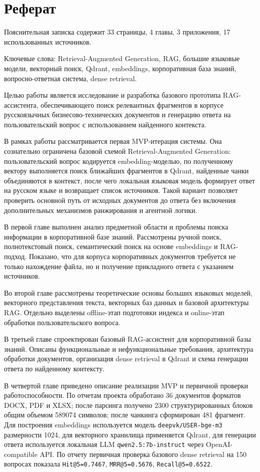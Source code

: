 \chapter*{Реферат}
\thispagestyle{plain}

Пояснительная записка содержит 33 страницы, 4 главы, 3 приложения, 17 использованных источников.

Ключевые слова: Retrieval-Augmented Generation, RAG, большие языковые модели, векторный поиск, Qdrant, embeddings, корпоративная база знаний, вопросно-ответная система, dense retrieval.

Целью работы является исследование и разработка базового прототипа RAG-ассистента, обеспечивающего поиск релевантных фрагментов в корпусе русскоязычных бизнесово-технических документов и генерацию ответа на пользовательский вопрос с использованием найденного контекста.

В рамках работы рассматривается первая MVP-итерация системы. Она сознательно ограничена базовой схемой Retrieval-Augmented Generation: пользовательский вопрос кодируется embedding-моделью, по полученному вектору выполняется поиск ближайших фрагментов в Qdrant, найденные чанки объединяются в контекст, после чего локальная языковая модель формирует ответ на русском языке и возвращает список источников. Такой вариант позволяет проверить основной путь от исходных документов до ответа без включения дополнительных механизмов ранжирования и агентной логики.

В первой главе выполнен анализ предметной области и проблемы поиска информации в корпоративной базе знаний. Рассмотрены ручной поиск, полнотекстовый поиск, семантический поиск на основе embeddings и RAG-подход. Показано, что для корпуса корпоративных документов требуется не только нахождение файла, но и получение прикладного ответа с указанием источников.

Во второй главе рассмотрены теоретические основы больших языковых моделей, векторного представления текста, векторных баз данных и базовой архитектуры RAG. Отдельно выделены offline-этап подготовки индекса и online-этап обработки пользовательского вопроса.

В третьей главе спроектирован базовый RAG-ассистент для корпоративной базы знаний. Описаны функциональные и нефункциональные требования, архитектура обработки документов, организация dense retrieval в Qdrant и схема генерации ответа по найденному контексту.

В четвертой главе приведено описание реализации MVP и первичной проверки работоспособности. По отчетам проекта обработано 36 документов форматов DOCX, PDF и XLSX; после парсинга получено 2300 структурированных блоков общим объемом 589074 символов; после чанкинга сформирован 481 фрагмент. Для построения embeddings используется модель \texttt{deepvk/USER-bge-m3} размерности 1024, для векторного хранилища применяется Qdrant, для генерации ответа используется локальная LLM \texttt{qwen2.5:7b-instruct} через OpenAI-compatible API. По отчету  первичная проверка базового dense retrieval на 150 вопросах показала \texttt{Hit@5=0.7467}, \texttt{MRR@5=0.5676}, \texttt{Recall@5=0.6522}.

